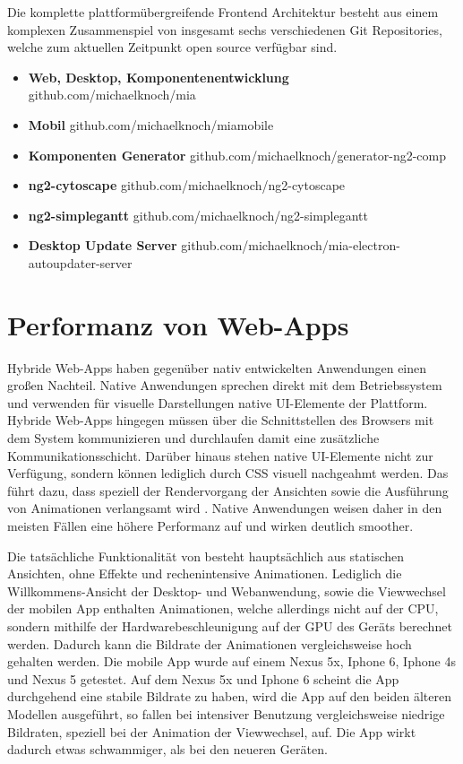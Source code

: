 Die komplette plattformübergreifende Frontend Architektur besteht aus einem komplexen Zusammenspiel von insgesamt sechs verschiedenen Git Repositories,
welche zum aktuellen Zeitpunkt open source verfügbar sind.

\begin{itemize}
  \item{\textbf{Web, Desktop, Komponentenentwicklung} github.com/michaelknoch/mia}
  \item{\textbf{Mobil} github.com/michaelknoch/miamobile}
  \item{\textbf{Komponenten Generator} github.com/michaelknoch/generator-ng2-comp}
  \item{\textbf{ng2-cytoscape} github.com/michaelknoch/ng2-cytoscape}
  \item{\textbf{ng2-simplegantt} github.com/michaelknoch/ng2-simplegantt}
  \item{\textbf{Desktop Update Server} github.com/michaelknoch/mia-electron-autoupdater-server}
\end{itemize}

\section{Performanz von Web-Apps}

Hybride Web-Apps haben gegenüber nativ entwickelten Anwendungen einen großen Nachteil.
Native Anwendungen sprechen direkt mit dem Betriebssystem und verwenden für visuelle Darstellungen native \ac{UI}-Elemente der Plattform.
Hybride Web-Apps hingegen müssen über die Schnittstellen des Browsers mit dem System kommunizieren
und durchlaufen damit eine zusätzliche Kommunikationsschicht.
Darüber hinaus stehen native \ac{UI}-Elemente nicht zur Verfügung, sondern können lediglich durch \ac{CSS} visuell nachgeahmt werden.
Das führt dazu, dass speziell der Rendervorgang der Ansichten sowie die Ausführung von Animationen verlangsamt wird \cite{Webvs43:online}.
Native Anwendungen weisen daher in den meisten Fällen eine höhere Performanz auf und wirken deutlich
smoother.

Die tatsächliche Funktionalität von \projectname{} besteht hauptsächlich aus statischen Ansichten, ohne Effekte und
rechenintensive Animationen. Lediglich die Willkommens-Ansicht der Desktop- und Webanwendung,
sowie die Viewwechsel der mobilen App enthalten Animationen, welche allerdings nicht auf der CPU,
sondern mithilfe der Hardwarebeschleunigung auf der GPU des Geräts berechnet werden.
Dadurch kann die Bildrate der Animationen vergleichsweise hoch gehalten werden.
Die mobile App wurde auf einem Nexus 5x, Iphone 6, Iphone 4s und Nexus 5 getestet.
Auf dem Nexus 5x und Iphone 6 scheint die App durchgehend eine stabile Bildrate zu haben,
wird die App auf den beiden älteren Modellen ausgeführt,
so fallen bei intensiver Benutzung vergleichsweise niedrige
Bildraten, speziell bei der Animation der Viewwechsel, auf.
Die App wirkt dadurch etwas schwammiger, als bei den neueren Geräten.

